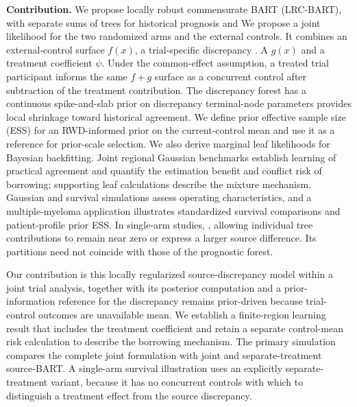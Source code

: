 \documentclass[11pt]{article}
\newcommand{\lrc}{LRC-BART} %
\theoremstyle{remark}\newtheorem{remark}{Remark}[section]
\providecommand{\DIFaddtex}[1]{{\protect\color{blue} \sf #1}} %
\providecommand{\DIFdeltex}[1]{{\protect\color{red} \scriptsize #1}} %
\providecommand{\DIFaddbegin}{} %
\providecommand{\DIFaddend}{} %
\providecommand{\DIFdelbegin}{} %
\providecommand{\DIFdelend}{} %
\providecommand{\DIFadd}[1]{\texorpdfstring{\DIFaddtex{#1}}{#1}} %
\providecommand{\DIFdel}[1]{\texorpdfstring{\DIFdeltex{#1}}{}} %
\begin{document}
\DIFdelbegin %
\DIFdel{\textbf{Contribution.}
We propose locally robust commensurate BART (\lrc{}), with separate sums of trees for historical prognosis and }\DIFdelend \DIFaddbegin \DIFadd{We propose a joint likelihood for the two randomized arms and the external controls. It combines an external-control surface $f(x)$, a }\DIFaddend trial-specific discrepancy \DIFdelbegin \DIFdel{. A }\DIFdelend \DIFaddbegin \DIFadd{$g(x)$ and a treatment coefficient $\psi$. Under the common-effect assumption, a treated trial participant informs the same $f+g$ surface as a concurrent control after subtraction of the treatment contribution. The discrepancy forest has a }\DIFaddend continuous spike-and-slab prior\DIFdelbegin \DIFdel{on discrepancy terminal-node parameters provides local shrinkage toward historical agreement. We define prior effective sample size (ESS) for an RWD-informed prior on the current-control mean and use it as a reference for prior-scale selection. We also derive marginal leaf likelihoods for Bayesian backfitting. Joint regional Gaussian benchmarks establish learning of practical agreement and quantify the estimation benefit and conflict risk of borrowing; supporting leaf calculations describe the mixture mechanism. Gaussian and survival simulations assess operating characteristics, and a multiple-myeloma application illustrates standardized survival comparisons and patient-profile prior ESS. In single-arm studies, }\DIFdelend \DIFaddbegin \DIFadd{, allowing individual tree contributions to remain near zero or express a larger source difference. Its partitions need not coincide with those of the prognostic forest.
}

\DIFadd{Our contribution is this locally regularized source-discrepancy model within a joint trial analysis, together with its posterior computation and a prior-information reference for }\DIFaddend the \DIFdelbegin \DIFdel{discrepancy remains prior-driven because }\DIFdelend trial-control \DIFdelbegin \DIFdel{outcomes are unavailable}\DIFdelend \DIFaddbegin \DIFadd{mean. We establish a finite-region learning result that includes the treatment coefficient and retain a separate control-mean risk calculation to describe the borrowing mechanism. The primary simulation compares the complete joint formulation with joint and separate-treatment source-BART. A single-arm survival illustration uses an explicitly separate-treatment variant, because it has no concurrent controls with which to distinguish a treatment effect from the source discrepancy}\DIFaddend .
\end{document}
